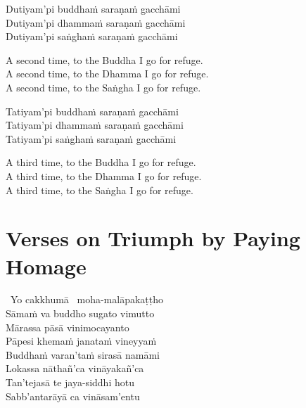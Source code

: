 \begin{pali-hang-continued}
  Dutiyam'pi buddhaṁ saraṇaṁ gacchāmi\\
  Dutiyam'pi dhammaṁ saraṇaṁ gacchāmi\\
  Dutiyam'pi saṅghaṁ saraṇaṁ gacchāmi
\end{pali-hang-continued}

\begin{english-verses}
  A second time, to the Buddha I go for refuge.\\
  A second time, to the Dhamma I go for refuge.\\
  A second time, to the Saṅgha I go for refuge.
\end{english-verses}

\begin{pali-hang-continued}
  Tatiyam'pi buddhaṁ saraṇaṁ gacchāmi\\
  Tatiyam'pi dhammaṁ saraṇaṁ gacchāmi\\
  Tatiyam'pi saṅghaṁ saraṇaṁ gacchāmi
\end{pali-hang-continued}

\begin{english-verses}
  A third time, to the Buddha I go for refuge.\\
  A third time, to the Dhamma I go for refuge.\\
  A third time, to the Saṅgha I go for refuge.
\end{english-verses}

\suttaRef{[Kp 1]}



\begingroup
\setsechook{%
  \clearpage%
  \setsecnumformat{}%
}

\section{Verses on Triumph by Paying Homage}
\label{triumph-by-paying-homage}

\begin{pali-hang-together}
  \anglebracketleft\ \hspace{-0.5mm}Yo cakkhumā \hspace{-0.5mm}\anglebracketright\  moha-malāpakaṭṭho\\
  Sāmaṁ va buddho sugato vimutto\\
  Mārassa pāsā vinimocayanto\\
  Pāpesi khemaṁ janataṁ vineyyaṁ\\
  Buddhaṁ varan'taṁ sirasā namāmi\\
  Lokassa nāthañ'ca vināyakañ'ca\\
  Tan'tejasā te jaya-siddhi hotu\\
  Sabb'antarāyā ca vināsam'entu
\end{pali-hang-together}

